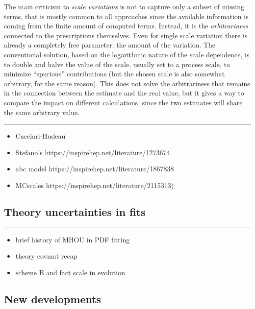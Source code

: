 The main criticism to \textit{scale variations} is not to capture only a subset
of missing terms, that is mostly common to all approaches since the available
information is coming from the finite amount of computed terms.
Instead, it is the \textit{arbitrariness} connected to the prescriptions
themselves.
%
Even for single scale variation there is already a completely free parameter:
the amount of the variation.
%
The conventional solution, based on the logarithmic nature of the scale
dependence, is to double and halve the value of the scale, usually set to a
process scale, to minimize \enquote{spurious} contributions (but the chosen
scale is also somewhat arbitrary, for the same reason).
%
This does not solve the arbitrariness that remains in the connection between
the estimate and the real value, but it gives a way to compare the impact on
different calculations, since the two estimates will share the same arbitrary
value.

\vspace*{20pt}
\noindent
\rule{\hsize}{1pt}

\begin{itemize}
	\item Cacciari-Hudeau
	\item  Stefano's https://inspirehep.net/literature/1273674
	\item abc model https://inspirehep.net/literature/1867838
	\item MCscales https://inspirehep.net/literature/2115313)
\end{itemize} 

\subsection{Theory uncertainties in \pdf fits}
\label{sec:pine/mhou-pdf}

\vspace*{20pt}
\noindent
\rule{\hsize}{1pt}

\begin{itemize}
	\item brief history of MHOU in PDF fitting
	\item theory covmat recap
	\item scheme B and fact scale in evolution
\end{itemize}

\subsection{New developments}
\label{sec:pine/mhou-pdf-new}

